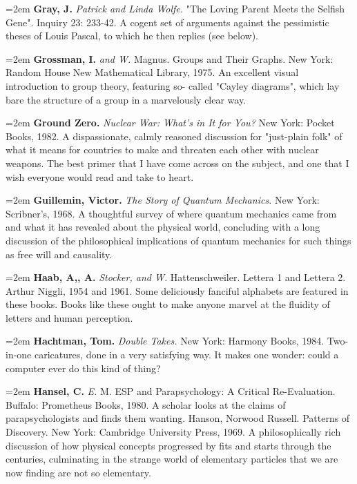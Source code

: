 \par\noindent\hangindent=2em {\bf Gray, J.} {\it Patrick and Linda Wolfe.} "The Loving Parent Meets the Selfish Gene". Inquiry 23: 233-42. A cogent set of arguments against the pessimistic theses of Louis Pascal, to which he then replies (see below).

\par\noindent\hangindent=2em {\bf Grossman, I.} {\it and W.} Magnus. Groups and Their Graphs. New York: Random House New Mathematical Library, 1975. An excellent visual introduction to group theory, featuring so- called "Cayley diagrams", which lay bare the structure of a group in a marvelously clear way.

\par\noindent\hangindent=2em {\bf Ground Zero.} {\it Nuclear War: What's in It for You?} New York: Pocket Books, 1982. A dispassionate, calmly reasoned discussion for "just-plain folk" of what it means for countries to make and threaten each other with nuclear weapons. The best primer that I have come across on the subject, and one that I wish everyone would read and take to heart.

\par\noindent\hangindent=2em {\bf Guillemin, Victor.} {\it The Story of Quantum Mechanics.} New York: Scribner's, 1968. A thoughtful survey of where quantum mechanics came from and what it has revealed about the physical world, concluding with a long discussion of the philosophical implications of quantum mechanics for such things as free will and causality.

\par\noindent\hangindent=2em {\bf Haab, A,, A.} {\it Stocker, and W.} Hattenschweiler. Lettera 1 and Lettera 2. Arthur Niggli, 1954 and 1961. Some deliciously fanciful alphabets are featured in these books. Books like these ought to make anyone marvel at the fluidity of letters and human perception.

\par\noindent\hangindent=2em {\bf Hachtman, Tom.} {\it Double Takes.} New York: Harmony Books, 1984. Two-in-one caricatures, done in a very satisfying way. It makes one wonder: could a computer ever do this kind of thing?

\par\noindent\hangindent=2em {\bf Hansel, C.} {\it E.} M. ESP and Parapsychology: A Critical Re-Evaluation. Buffalo: Prometheus Books, 1980. A scholar looks at the claims of parapsychologists and finds them wanting. Hanson, Norwood Russell. Patterns of Discovery. New York: Cambridge University Press, 1969. A philosophically rich discussion of how physical concepts progressed by fits and starts through the centuries, culminating in the strange world of elementary particles that we are now finding are not so elementary.


